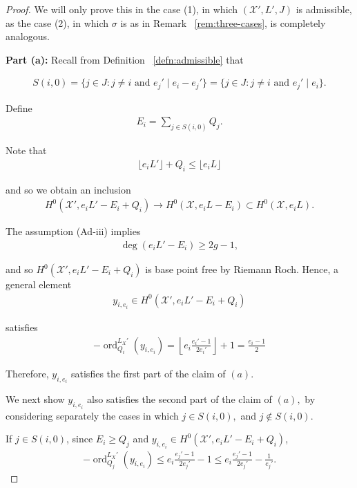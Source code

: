\documentclass{amsart}
\theoremstyle{plain}
\theoremstyle{definition}
\theoremstyle{remark}
\numberwithin{equation}{section}
\newcommand \sx{\mathscr X}
\DeclareMathOperator{\ord}{ord}
\newcommand \subhalf[1]{\frac{{#1} - 1}{2{#1}}}
\newcommand \halfcan{L}
\begin{document}
\begin{proof}
We will only prove this in the case (1), in which $(\sx', \halfcan', J)$ is admissible, as the case (2), in which $\sigma$ is as in Remark ~\ref{rem:three-cases}, is completely analogous.

{\bf Part (a):} 
Recall from Definition ~\ref{defn:admissible} that

\begin{align*}
	S(i,0) = \{j \in J : j \neq i \text{ and }e_j' \mid e_i-e_j'\} = \{j \in J : j \neq i \text{ and }e_j' \mid e_i\}.
\end{align*}

\noindent
Define
\begin{align*}
	E_i = \sum_{j \in S(i,0)}^{}Q_j.
\end{align*}

\noindent
Note that
\begin{align*}
	\lfloor e_i L' \rfloor + Q_i \leq \lfloor e_i L \rfloor 
\end{align*}

\noindent
and so we obtain an inclusion
\begin{align*}
	H^0(\sx', e_iL'-E_i + Q_i) \rightarrow H^0(\sx, e_iL - E_i) \subset 
H^0(\sx, e_iL).
\end{align*}

\noindent
The assumption (Ad-iii) implies
\begin{align*}
	\deg \left( e_i L' - E_i \right) \geq 2g - 1,
\end{align*}

\noindent
and so $H^0(\sx', e_iL'-E_i + Q_i)$ is base point free by 
Riemann Roch.
Hence, a general element
\begin{align*}
	y_{i, e_i} \in H^0(\sx', e_iL'-E_i + Q_i)
\end{align*}

\noindent
satisfies
\begin{align*}
	-\ord_{Q_i}
^{\halfcan_X'}(y_{i, e_i}) = \left\lfloor e_i \subhalf {e_i'} \right\rfloor + 1 =
	\frac{e_i - 1}{2}
\end{align*}

\noindent
Therefore, $y_{i, e_i}$ satisfies the first part of the claim of $(a)$.

We next show $y_{i, e_i}$ also satisfies the second part of the
claim of $(a),$ by considering separately the cases in which $j
\in S(i, 0),$ and $j \notin S(i,0)$.

If $j \in S(i,0)$, since $E_i \geq Q_j$ and $y_{i, e_i} \in H^0
(\sx', e_iL'-E_i + Q_i)$,
\begin{align*}
	-\ord_{Q_j}
^{\halfcan_X'}(y_{i, e_i}) \leq e_i\subhalf {e_j'} - 1 \leq e_i 
	\subhalf{e_j'} - \frac{1}{e_j'}.
\end{align*}


\end{proof}
\end{document}
